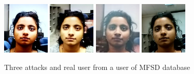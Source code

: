 \begin{figure}[htb]
\centering
\includegraphics[width=0.2\textwidth]{images_databases/MFSD/at1-2.jpg}
\includegraphics[width=0.2\textwidth]{images_databases/MFSD/at2-2.jpg}
\includegraphics[width=0.2\textwidth]{images_databases/MFSD/at3-2.jpg}
\includegraphics[width=0.2\textwidth]{images_databases/MFSD/2.jpg}
\caption{Three attacks and real user from a user of MFSD database } \label{fig:mfsd2}
\end{figure}

